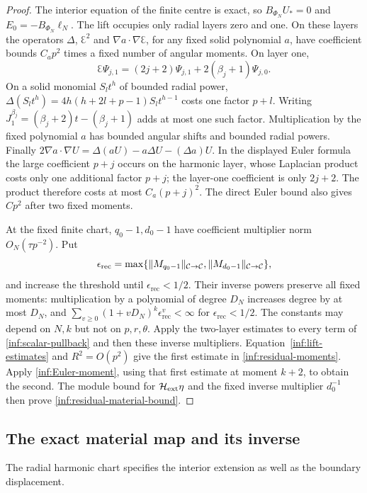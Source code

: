 \begin{proof}
The interior equation of the finite centre is exact, so
$B_{\Phi_N}U_*=0$ and $E_0=-B_{\Phi_N}\ell_N$.
The lift occupies only radial layers zero and one.
On these layers the operators $\Delta$, $\Euler^2$ and
$\nabla a\cdot\nabla\Euler$, for any fixed solid polynomial $a$,
have coefficient bounds $C_a p^2$ times a fixed number of angular
moments.
On layer one,
\[
 \Euler\Psi_{j,1}=(2j+2)\Psi_{j,1}
                            +2(\beta_j+1)\Psi_{j,0}.
\]
On a solid monomial $S_l t^h$ of bounded radial power,
$\Delta(S_lt^h)=4h(h+2l+p-1)S_lt^{h-1}$ costs one factor $p+l$.
Writing $J_1^{\beta_j}=(\beta_j+2)t-(\beta_j+1)$ adds at most one
such factor. Multiplication by the fixed polynomial $a$ has bounded
angular shifts and bounded radial powers.
Finally
$2\nabla a\cdot\nabla U=\Delta(aU)-a\Delta U-(\Delta a)U$.
In the displayed Euler formula the large coefficient $p+j$ occurs
on the harmonic layer, whose Laplacian product costs only one
additional factor $p+j$; the layer-one coefficient is only $2j+2$.
The product therefore costs at most $C_a(p+j)^2$.
The direct Euler bound also gives $Cp^2$ after two fixed moments.

At the fixed finite chart, $q_0-1,d_0-1$ have coefficient multiplier
norm $O_N(\tau p^{-2})$. Put
\[
 \epsilon_{\mathrm{rec}}
 =\max\{\lVert M_{q_0-1}\rVert_{\mathcal C\to\mathcal C},
                 \lVert M_{d_0-1}\rVert_{\mathcal C\to\mathcal C}\},
\]
and increase the threshold until $\epsilon_{\mathrm{rec}}<1/2$.
Their inverse powers preserve all fixed moments: multiplication
by a polynomial of degree $D_N$ increases
degree by at most $D_N$, and
$\sum_{v\ge0}(1+vD_N)^k\epsilon_{\mathrm{rec}}^v<\infty$ for
$\epsilon_{\mathrm{rec}}<1/2$.
The constants may depend on $N,k$ but not on $p,r,\theta$.
Apply the two-layer estimates to every term of
\eqref{inf:scalar-pullback} and then these inverse multipliers.
Equation~\eqref{inf:lift-estimates} and $R^2=O(p^2)$ give the
first estimate in \eqref{inf:residual-moments}.
Apply \eqref{inf:Euler-moment}, using that first estimate at moment
$k+2$, to obtain the second.
The module bound for $\mathcal H_{\mathrm{ext}}\eta$ and the fixed inverse multiplier
$d_0^{-1}$ then prove \eqref{inf:residual-material-bound}.
\end{proof}

\subsection{The exact material map and its inverse}

The radial harmonic chart specifies the interior extension as well
as the boundary displacement.

